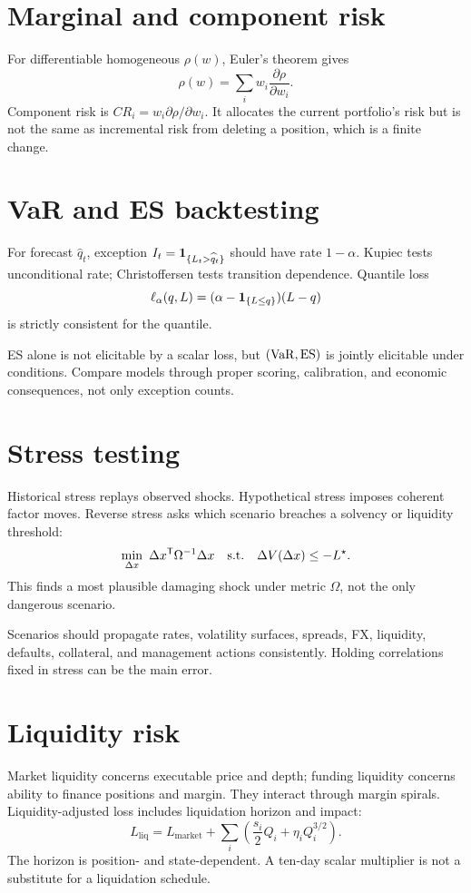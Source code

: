 \section{Marginal and component risk}

For differentiable homogeneous $\rho(w)$, Euler's theorem gives
\[
\rho(w)=\sum_iw_i\frac{\partial\rho}{\partial w_i}.
\]
Component risk is $CR_i=w_i\partial\rho/\partial w_i$. It allocates the current
portfolio's risk but is not the same as incremental risk from deleting a position,
which is a finite change.

\section{VaR and ES backtesting}

For forecast $\widehat q_t$, exception $I_t=\mathbf 1_{\{L_t>\widehat q_t\}}$ should have
rate $1-\alpha$. Kupiec tests unconditional rate; Christoffersen tests transition
dependence. Quantile loss
\[
\ell_\alpha(q,L)=(\alpha-\mathbf 1_{\{L\leq q\}})(L-q)
\]
is strictly consistent for the quantile.

ES alone is not elicitable by a scalar loss, but $(\operatorname{VaR},\operatorname{ES})$ is jointly elicitable
under conditions. Compare models through proper scoring, calibration, and economic
consequences, not only exception counts.

\section{Stress testing}

Historical stress replays observed shocks. Hypothetical stress imposes coherent
factor moves. Reverse stress asks which scenario breaches a solvency or liquidity
threshold:
\[
\min_{\Delta x}\ \Delta x^\mathsf T\Omega^{-1}\Delta x
\quad\text{s.t.}\quad
\Delta V(\Delta x)\leq-L^\star.
\]
This finds a most plausible damaging shock under metric $\Omega$, not the only
dangerous scenario.

Scenarios should propagate rates, volatility surfaces, spreads, FX, liquidity,
defaults, collateral, and management actions consistently. Holding correlations
fixed in stress can be the main error.

\section{Liquidity risk}

Market liquidity concerns executable price and depth; funding liquidity concerns
ability to finance positions and margin. They interact through margin spirals.
Liquidity-adjusted loss includes liquidation horizon and impact:
\[
L_{\mathrm{liq}}=L_{\mathrm{market}}+
\sum_i\left(\frac{s_i}{2}Q_i+\eta_iQ_i^{3/2}\right).
\]
The horizon is position- and state-dependent. A ten-day scalar multiplier is not a
substitute for a liquidation schedule.

